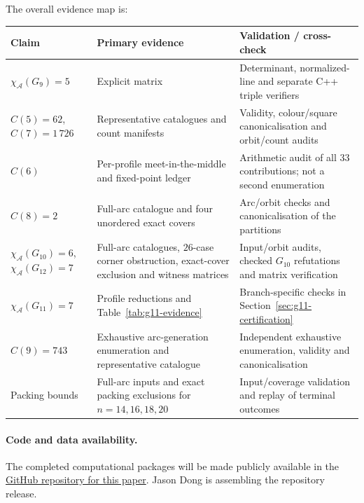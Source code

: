 \documentclass[11pt]{article}
\theoremstyle{definition}
\theoremstyle{remark}
\begin{document}
The overall evidence map is:
\begin{center}
\small
\renewcommand{\arraystretch}{1.08}
\begin{tabular}{@{}>{\raggedright\arraybackslash}p{}
                  >{\raggedright\arraybackslash}p{}
                  >{\raggedright\arraybackslash}p{}@{}}
\toprule
Claim & Primary evidence & Validation / cross-check\\
\midrule
\(\chi_{\mathcal A}(G_9)=5\)
& Explicit matrix
& Determinant, normalized-line and separate C++ triple verifiers\\
\(C(5)=62\), \(C(7)=1\,726\)
& Representative catalogues and count manifests
& Validity, colour/square canonicalisation and orbit/count audits\\
\(C(6)\)
& Per-profile meet-in-the-middle and fixed-point ledger
& Arithmetic audit of all 33 contributions; not a second enumeration\\
\(C(8)=2\)
& Full-arc catalogue and four unordered exact covers
& Arc/orbit checks and canonicalisation of the partitions\\
\(\chi_{\mathcal A}(G_{10})=6\), \(\chi_{\mathcal A}(G_{12})=7\)
& Full-arc catalogues, \(26\)-case corner obstruction, exact-cover exclusion
  and witness matrices
& Input/orbit audits, checked \(G_{10}\) refutations and matrix verification\\
\(\chi_{\mathcal A}(G_{11})=7\)
& Profile reductions and Table~\ref{tab:g11-evidence}
& Branch-specific checks in Section~\ref{sec:g11-certification}\\
\(C(9)=743\)
& Exhaustive arc-generation enumeration and representative catalogue
& Independent exhaustive enumeration, validity and canonicalisation\\
Packing bounds
& Full-arc inputs and exact packing exclusions for \(n=14,16,18,20\)
& Input/coverage validation and replay of terminal outcomes\\
\bottomrule
\end{tabular}
\end{center}

\paragraph{Code and data availability.}
The completed computational packages will be made publicly available in the
\href{https://github.com/donghaoxuan13818851792-code/no-three-in-line-colourings}{GitHub repository for this paper}.
Jason Dong is assembling the repository release.
\end{document}
